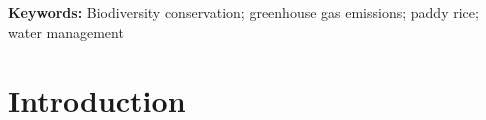 

\noindent\textbf{Keywords:} Biodiversity conservation; greenhouse gas emissions; paddy rice; water management  %





\section{Introduction}
\label{sec:intro}

